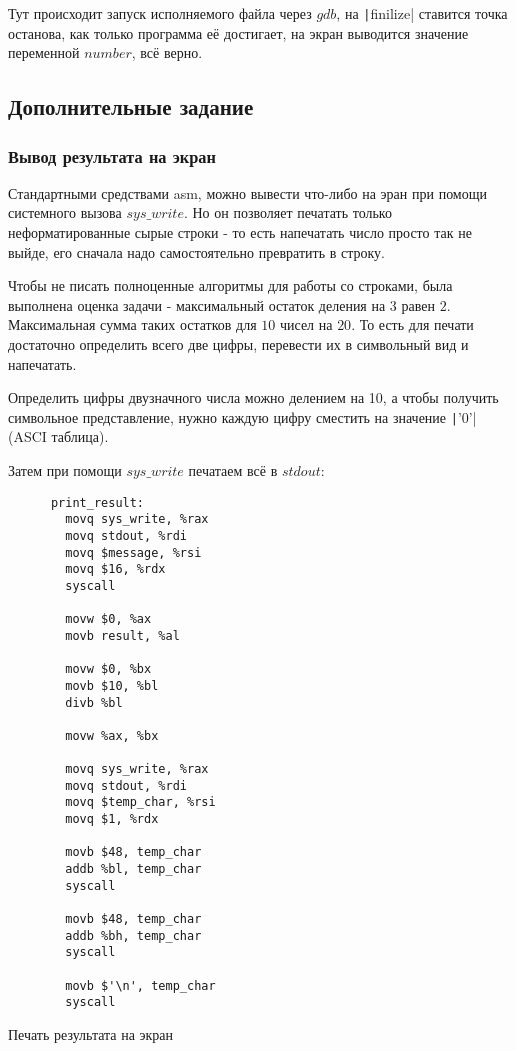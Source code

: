 \documentclass[a4paper]{article}
\begin{document}
  Тут происходит запуск исполняемого файла через $gdb$,
  на \texttt|finilize| ставится точка останова,
  как только программа её достигает, на экран выводится значение
  переменной $number$, всё верно.

  \subsection{Дополнительные задание}

  \subsubsection{Вывод результата на экран}

  Стандартными средствами asm, можно вывести что-либо на эран
  при помощи системного вызова $sys\_write$. Но он позволяет
  печатать только неформатированные сырые строки - то есть напечатать
  число просто так не выйде, его сначала надо самостоятельно превратить в строку.

  Чтобы не писать полноценные алгоритмы для работы со строками, была
  выполнена оценка задачи - максимальный остаток деления на $3$ равен
  $2$. Максимальная сумма таких остатков для $10$ чисел на $20$. То есть
  для печати достаточно определить всего две цифры, перевести их в символьный вид
  и напечатать.

  Определить цифры двузначного числа можно делением на 10,
  а чтобы получить символьное представление, нужно каждую цифру
  сместить на значение \texttt|'0'| (ASCI таблица).

  Затем при помощи $sys\_write$ печатаем всё в $stdout$:
  
  \begin{listing}[H]
    \begin{verbatim}
      print_result:
        movq sys_write, %rax
        movq stdout, %rdi
        movq $message, %rsi
        movq $16, %rdx
        syscall
    
        movw $0, %ax
        movb result, %al
     
        movw $0, %bx 
        movb $10, %bl
        divb %bl
    
        movw %ax, %bx
     
        movq sys_write, %rax
        movq stdout, %rdi
        movq $temp_char, %rsi
        movq $1, %rdx
    
        movb $48, temp_char
        addb %bl, temp_char
        syscall
    
        movb $48, temp_char
        addb %bh, temp_char
        syscall
        
        movb $'\n', temp_char
        syscall
    \end{verbatim}
    \caption{Печать результата на экран}
  \end{listing}
\end{document}
